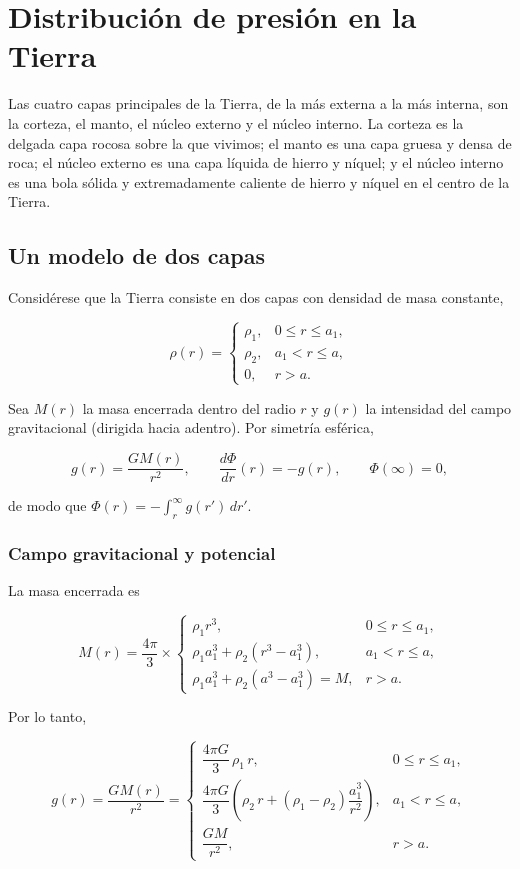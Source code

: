 \section{Distribución de presión en la Tierra}

Las cuatro capas principales de la Tierra, de la más externa a la más interna, son la corteza, el manto, el núcleo externo y el núcleo interno. La corteza es la delgada capa rocosa sobre la que vivimos; el manto es una capa gruesa y densa de roca; el núcleo externo es una capa líquida de hierro y níquel; y el núcleo interno es una bola sólida y extremadamente caliente de hierro y níquel en el centro de la Tierra.

\subsection{Un modelo de dos capas}

Considérese que la Tierra consiste en dos capas con densidad de masa constante,

$$ \rho(r) = \begin{cases} \rho_1, & 0 \le r \le a_1, \\ \rho_2, & a_1 < r \le a, \\ 0, & r > a. \end{cases} $$

Sea $M(r)$ la masa encerrada dentro del radio $r$ y $g(r)$ la intensidad del campo gravitacional (dirigida hacia adentro). Por simetría esférica,

$$ g(r) = \frac{GM(r)}{r^2}, \qquad \frac{d\Phi}{dr}(r) = -g(r), \qquad \Phi(\infty) = 0, $$

de modo que $\Phi(r) = -\int_r^\infty g(r')\,dr'$.

\subsubsection*{Campo gravitacional y potencial}

La masa encerrada es

$$ M(r) = \frac{4\pi}{3} \times \begin{cases} \rho_1 r^3, & 0 \le r \le a_1, \\ \rho_1 a_1^3 + \rho_2\left(r^3 - a_1^3\right), & a_1 < r \le a, \\ \rho_1 a_1^3 + \rho_2\left(a^3 - a_1^3\right) = M, & r > a. \end{cases} $$

Por lo tanto,

$$ g(r) = \frac{GM(r)}{r^2} = \begin{cases} \dfrac{4\pi G}{3}\,\rho_1\, r, & 0 \le r \le a_1, \\[2mm] \dfrac{4\pi G}{3}\left(\rho_2\, r + (\rho_1 - \rho_2)\dfrac{a_1^3}{r^2}\right), & a_1 < r \le a, \\[2mm] \dfrac{GM}{r^2}, & r > a. \end{cases} $$

